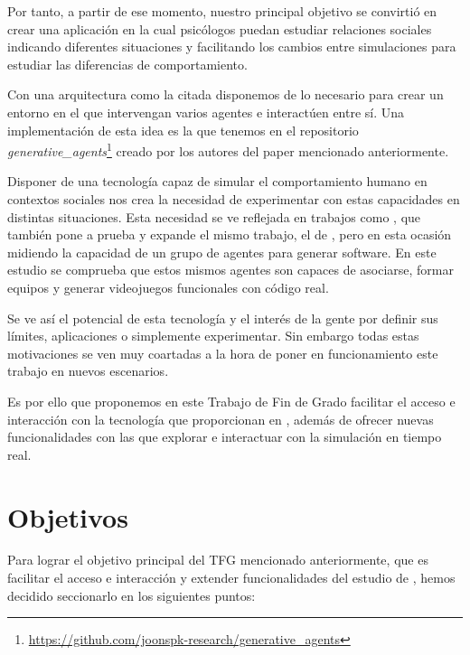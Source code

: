 Por tanto, a partir de ese momento, nuestro principal objetivo se convirtió en crear una aplicación en la cual psicólogos puedan estudiar relaciones sociales indicando diferentes situaciones y facilitando los cambios entre simulaciones para estudiar las diferencias de comportamiento.

Con una arquitectura como la citada disponemos de lo necesario para crear un entorno en el que intervengan varios agentes e interactúen entre sí. Una implementación de esta idea es la que tenemos en el repositorio {\textit{generative\_agents}}\footnote{\url{https://github.com/joonspk-research/generative_agents}} creado por los autores del paper mencionado anteriormente.

Disponer de una tecnología capaz de simular el comportamiento humano en contextos sociales nos crea la necesidad de experimentar con estas capacidades en distintas situaciones. Esta necesidad se ve reflejada en trabajos como \cite{qian2023communicative}, que también pone a prueba y expande el mismo trabajo, el de \cite{park2023generative}, pero en esta ocasión midiendo la capacidad de un grupo de agentes para generar software. En este estudio se comprueba que estos mismos agentes son capaces de asociarse, formar equipos y generar videojuegos funcionales con código real.

Se ve así el potencial de esta tecnología y el interés de la gente por definir sus límites, aplicaciones o simplemente experimentar.
Sin embargo todas estas motivaciones se ven muy coartadas a la hora de poner en funcionamiento este trabajo en nuevos escenarios.

Es por ello que proponemos en este Trabajo de Fin de Grado facilitar el acceso e interacción con la tecnología que proporcionan en \ga, además de ofrecer nuevas funcionalidades con las que explorar e interactuar con la simulación en tiempo real.

\section{Objetivos}

Para lograr el objetivo principal del TFG mencionado anteriormente, que es facilitar el acceso e interacción y extender funcionalidades del estudio de  \ga, hemos decidido seccionarlo en los siguientes puntos:

